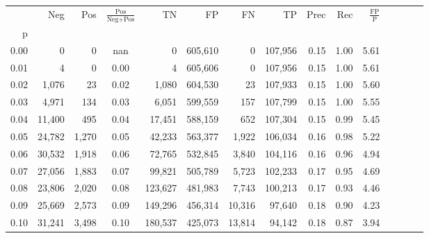 \begin{tabular}{rrrcrrrrrrrrrrr}
\toprule
{} &     Neg &    Pos & $\frac{\text{Pos}}{\text{Neg}+\text{Pos}}$ &       TN &       FP &       FN &       TP &  Prec &   Rec & $\frac{\text{FP}}{\text{P}}$ \\
p    &         &        &                                            &          &          &          &          &       &       &                              \\
\midrule
0.00 &       0 &      0 &                                        nan &        0 &  605,610 &        0 &  107,956 &  0.15 &  1.00 &                         5.61 \\
0.01 &       4 &      0 &                                       0.00 &        4 &  605,606 &        0 &  107,956 &  0.15 &  1.00 &                         5.61 \\
0.02 &   1,076 &     23 &                                       0.02 &    1,080 &  604,530 &       23 &  107,933 &  0.15 &  1.00 &                         5.60 \\
0.03 &   4,971 &    134 &                                       0.03 &    6,051 &  599,559 &      157 &  107,799 &  0.15 &  1.00 &                         5.55 \\
0.04 &  11,400 &    495 &                                       0.04 &   17,451 &  588,159 &      652 &  107,304 &  0.15 &  0.99 &                         5.45 \\
0.05 &  24,782 &  1,270 &                                       0.05 &   42,233 &  563,377 &    1,922 &  106,034 &  0.16 &  0.98 &                         5.22 \\
0.06 &  30,532 &  1,918 &                                       0.06 &   72,765 &  532,845 &    3,840 &  104,116 &  0.16 &  0.96 &                         4.94 \\
0.07 &  27,056 &  1,883 &                                       0.07 &   99,821 &  505,789 &    5,723 &  102,233 &  0.17 &  0.95 &                         4.69 \\
0.08 &  23,806 &  2,020 &                                       0.08 &  123,627 &  481,983 &    7,743 &  100,213 &  0.17 &  0.93 &                         4.46 \\
0.09 &  25,669 &  2,573 &                                       0.09 &  149,296 &  456,314 &   10,316 &   97,640 &  0.18 &  0.90 &                         4.23 \\
0.10 &  31,241 &  3,498 &                                       0.10 &  180,537 &  425,073 &   13,814 &   94,142 &  0.18 &  0.87 &                         3.94 \\

\end{tabular}
